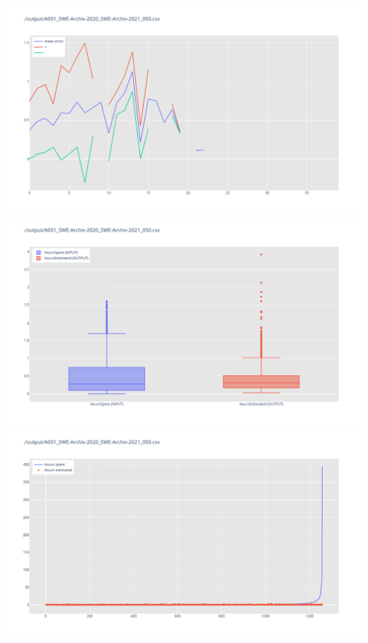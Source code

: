 \includegraphics[width=\textwidth]{Scripts/output/A001_SWE-Archiv-2020_SWE-Archiv-2021_050.csv.error_distribution.png}
\includegraphics[width=\textwidth]{Scripts/output/A001_SWE-Archiv-2020_SWE-Archiv-2021_050.csv.png}
\includegraphics[width=\textwidth]{Scripts/output/A001_SWE-Archiv-2020_SWE-Archiv-2021_050.csv.scatter.png}
